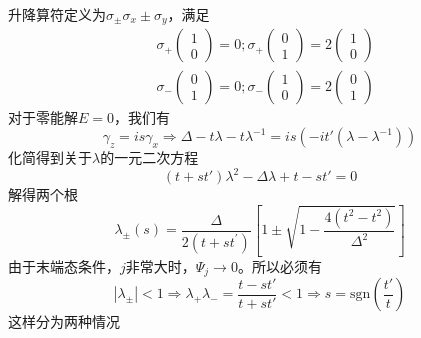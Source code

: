 \documentclass{article}
\numberwithin{equation}{subsection}
\begin{document}
升降算符定义为$\sigma_{\pm}\sigma_x\pm\sigma_y$，满足
\begin{equation}
    \begin{aligned}
        &\sigma_{+}\left(\begin{array}{l}
        1 \\
        0
        \end{array}\right)=0 ; \sigma_{+}\left(\begin{array}{l}
        0 \\
        1
        \end{array}\right)=2\left(\begin{array}{l}
        1 \\
        0
        \end{array}\right)\\
        &\sigma_{-}\left(\begin{array}{l}
        0 \\
        1
        \end{array}\right)=0 ; \sigma_{-}\left(\begin{array}{l}
        1 \\
        0
        \end{array}\right)=2\left(\begin{array}{l}
        0 \\
        1
        \end{array}\right)
        \end{aligned}
\end{equation}
对于零能解$E=0$，我们有
\begin{equation}
    \gamma_z=is\gamma_x\Longrightarrow\Delta-t\lambda-t\lambda^{-1}=is(-it'(\lambda-\lambda^{-1}))
\end{equation}
化简得到关于$\lambda$的一元二次方程
\begin{equation}
    (t+st')\lambda^2-\Delta\lambda+t-st'=0
\end{equation}
解得两个根
\begin{equation}
    \lambda_{\pm}(s)=\frac{\Delta}{2\left(t+s t^{\prime}\right)}[1 \pm \sqrt{1-\frac{4\left(t^{2}-t^{2}\right)}{\Delta^{2}}}]
\end{equation}
由于末端态条件，$j$非常大时，$\Psi_j\to0$。所以必须有
\begin{equation}
    |\lambda_\pm|<1\Longrightarrow\lambda_+\lambda_-=\frac{t-st'}{t+st'}<1\Longrightarrow s=\mathrm{sgn}(\frac{t'}{t})
\end{equation}
这样分为两种情况
\end{document}
